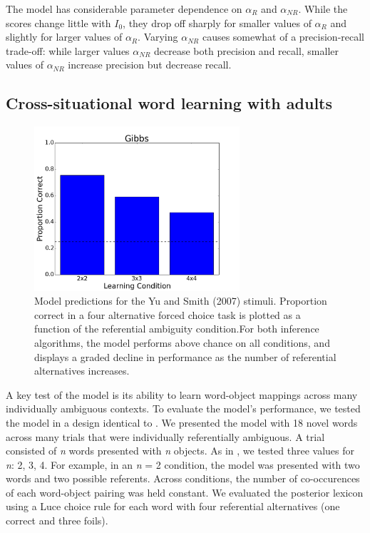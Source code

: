 \documentclass[man,noapacite,12pt]{apa2}
\begin{document}
The model has considerable parameter dependence on $\alpha_R$ and $\alpha_{NR}$. While the scores change little with $I_0$, they drop off sharply for smaller values of $\alpha_R$ and slightly for larger values of $\alpha_R$. Varying $\alpha_{NR}$ causes somewhat of a precision-recall trade-off: while larger values $\alpha_{NR}$ decrease both precision and recall, smaller values of $\alpha_{NR}$ increase precision but decrease recall.

\subsection{Cross-situational word learning with adults}

\begin{figure}[h!]
\centering
  \includegraphics[width=3in]{figures/Gibbs.png}
\caption{Model predictions for the Yu and Smith (2007) stimuli. Proportion correct in a four alternative forced choice task is plotted as a function of the referential ambiguity condition.For both inference algorithms, the model performs above chance on all conditions, and displays a graded decline in performance as the number of referential alternatives increases.}
\label{fig:yu2007sim}
\end{figure}

A key test of the model is its ability to learn word-object mappings across many individually ambiguous contexts. To evaluate the model's performance, we tested the model in a design identical to . We presented the model with 18 novel words across many trials that were individually referentially ambiguous. A trial consisted of  {\it n} words presented with {\it n}  objects. As in , we tested three values for  {\it n}: 2, 3, 4. For example, in an {\it n} = 2 condition, the model was presented with two words and two possible referents. Across conditions, the number of co-occurences of each word-object pairing was held constant. We evaluated the posterior lexicon using a Luce choice rule \cite{luce1959} for each word with four referential alternatives (one correct and three foils). 
\end{document}

